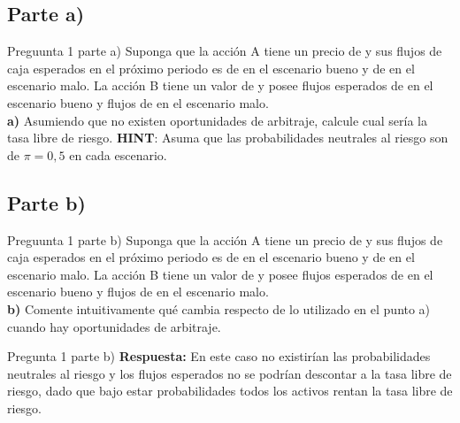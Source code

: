 \documentclass{beamer}
\begin{document}
\subsection{Parte a)}
\begin{frame}{Preguunta 1 parte a)}
  Suponga que la acción A tiene un precio de \dinero{\PaccionA} y sus flujos de caja esperados en el próximo periodo 
  es de \dinero{\FlujobuenoA} en el escenario bueno y de \dinero{\FlujomaloA} en el escenario malo. La acción B tiene un valor de 
  \dinero{\PaccionB} y posee flujos esperados de \dinero{\FlujobuenoB} en el escenario bueno y flujos de \dinero{\FlujomaloB} en el escenario malo. \\


  \textbf{a)}   Asumiendo que no existen oportunidades de arbitraje, calcule cual sería la tasa libre de riesgo.
  \textbf{HINT}: Asuma que las probabilidades neutrales al riesgo son de $\pi=0,5$ en cada escenario.
\end{frame}

\subsection{Parte b)}
\begin{frame}{Preguunta 1 parte b)}
  Suponga que la acción A tiene un precio de \dinero{\PaccionA} y sus flujos de caja esperados en el próximo periodo 
  es de \dinero{\FlujobuenoA} en el escenario bueno y de \dinero{\FlujomaloA} en el escenario malo. La acción B tiene un valor de 
  \dinero{\PaccionB} y posee flujos esperados de \dinero{\FlujobuenoB} en el escenario bueno y flujos de \dinero{\FlujomaloB} en el escenario malo. \\

  
  \textbf{b)} Comente intuitivamente qué cambia respecto de lo utilizado en el punto a) cuando hay oportunidades de arbitraje. \\
  
\end{frame}

\begin{frame}{Pregunta 1 parte b)}
  \textbf{Respuesta:} En este caso no existirían las probabilidades neutrales al riesgo y los flujos esperados no se podrían descontar 
  a la tasa libre de riesgo, dado que bajo estar probabilidades todos los activos rentan la tasa libre de riesgo.
\end{frame}

\newcommand{\dividendo}{1}
\end{document}
